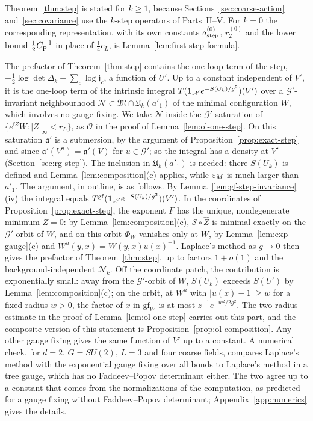 Theorem~\ref{thm:step} is stated for $k\ge1$, because Sections~\ref{sec:coarse-action} and~\ref{sec:covariance} use the $k$-step operators of Parts~II--V. For $k=0$ the corresponding representation, with its own constants $a^{(0)}_{\rm step}$, $r^{(0)}_2$ and the lower bound $\frac12C_{\rm P}^{-1}$ in place of $\frac14c_L$, is Lemma~\ref{lem:first-step-formula}.

\begin{remark}\label{rem:one-loop-intrinsic}
The prefactor of Theorem~\ref{thm:step} contains the one-loop term of the step, $-\frac12\log\det\Delta_k+\sum_c\log\mathfrak j_c$, a function of $U'$. Up to a constant independent of $V'$, it is the one-loop term of the intrinsic integral $T(\mathbf 1_{\mathscr N}e^{-S(U_k)/g^2})(V')$ over a $\mathcal G'$-invariant neighbourhood $\mathscr N\subset\mathfrak M\cap\mathfrak U_k(a'_1)$ of the minimal configuration $W$, which involves no gauge fixing. We take $\mathscr N$ inside the $\mathcal G'$-saturation of $\{e^{\ii Z}W:|Z|_\infty<r_L\}$, as $\mathscr O$ in the proof of Lemma~\ref{lem:ol-one-step}. On this saturation $\mathfrak a'$ is a submersion, by the argument of Proposition~\ref{prop:exact-step} and since $\mathfrak a'(V^u)=\mathfrak a'(V)$ for $u\in\mathcal G'$; so the integral has a density at $V'$ (Section~\ref{sec:rg-step}). The inclusion in $\mathfrak U_k(a'_1)$ is needed: there $S(U_k)$ is defined and Lemma~\ref{lem:composition}(c) applies, while $\varepsilon_M$ is much larger than $a'_1$. The argument, in outline, is as follows. By Lemma~\ref{lem:gf-step-invariance}(iv) the integral equals $T^{\rm gf}(\mathbf 1_{\mathscr N}e^{-S(U_k)/g^2})(V')$. In the coordinates of Proposition~\ref{prop:exact-step}, the exponent $F$ has the unique, nondegenerate minimum $Z=0$: by Lemma~\ref{lem:composition}(c), $\mathcal S\circ\hat Z$ is minimal exactly on the $\mathcal G'$-orbit of $W$, and on this orbit $\Phi_W$ vanishes only at $W$, by Lemma~\ref{lem:exp-gauge}(c) and $W^u(y,x)=W(y,x)u(x)^{-1}$. Laplace's method as $g\to0$ then gives the prefactor of Theorem~\ref{thm:step}, up to factors $1+o(1)$ and the background-independent $\mathcal N_k$. Off the coordinate patch, the contribution is exponentially small: away from the $\mathcal G'$-orbit of $W$, $S(U_k)$ exceeds $S(U')$ by Lemma~\ref{lem:composition}(c); on the orbit, at $W^u$ with $|u(x)-1|\ge w$ for a fixed radius $w>0$, the factor of $x$ in $\mathrm{gf}_W$ is at most $z^{-1}e^{-w^2/2g^2}$. The two-radius estimate in the proof of Lemma~\ref{lem:ol-one-step} carries out this part, and the composite version of this statement is Proposition~\ref{prop:ol-composition}. Any other gauge fixing gives the same function of $V'$ up to a constant. A numerical check, for $d=2$, $G=SU(2)$, $L=3$ and four coarse fields, compares Laplace's method with the exponential gauge fixing over all bonds to Laplace's method in a tree gauge, which has no Faddeev--Popov determinant either. The two agree up to a constant that comes from the normalizations of the computation, as predicted for a gauge fixing without Faddeev--Popov determinant; Appendix~\ref{app:numerics} gives the details.
\end{remark}

